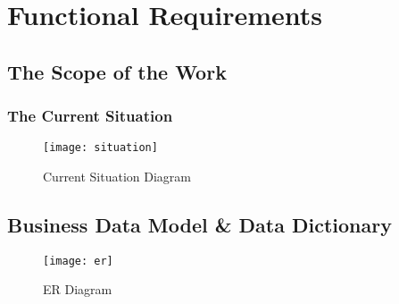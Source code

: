 \documentclass[12pt,fleqn]{article}
\begin{document}
\section {Functional Requirements}

\subsection {The Scope of the Work}

\subsubsection{The Current Situation}

\begin{figure}[htp]
\centering
\texttt{[image: situation]}
\caption{Current Situation Diagram}
\label{fig:env}
\end{figure}

\subsection {Business Data Model \& Data Dictionary}
\begin{figure}[H]
\centering
\texttt{[image: er]}
\caption{ER Diagram}
\label{fig:ER}
\end{figure}
\end{document}
